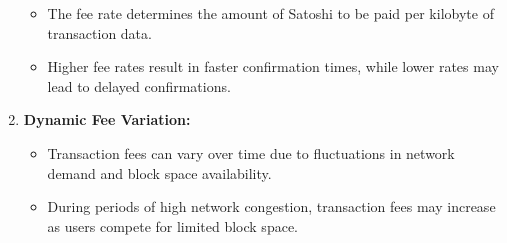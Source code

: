 \begin{enumerate}
\begin{itemize}
		\item The fee rate determines the amount of Satoshi to be paid per kilobyte of transaction data.
		\item Higher fee rates result in faster confirmation times, while lower rates may lead to delayed confirmations.
	\end{itemize}
	\item \textbf{Dynamic Fee Variation:}
	\begin{itemize}
		\item Transaction fees can vary over time due to fluctuations in network demand and block space availability.
		\item During periods of high network congestion, transaction fees may increase as users compete for limited block space.
	\end{itemize}
\end{enumerate}

